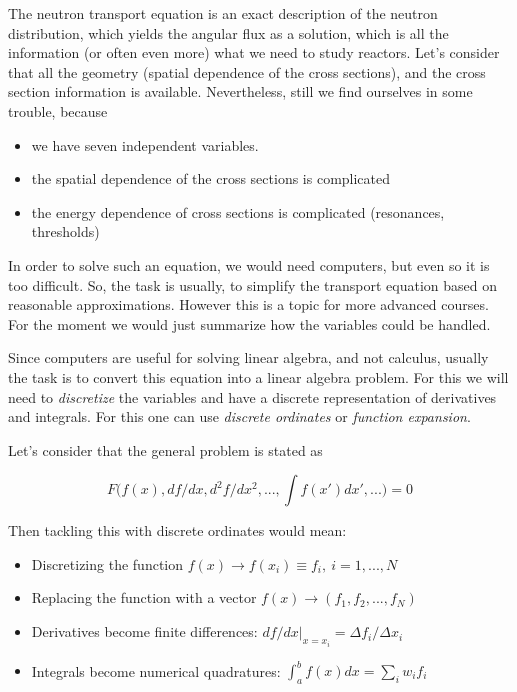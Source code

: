 The neutron transport equation is an exact description of the neutron distribution, which yields the angular flux as a solution, which is all the information (or often even more) what we need to study reactors. Let's consider that all the geometry (spatial dependence of the cross sections), and the cross section information is available. Nevertheless, still we find ourselves in some trouble, because

\begin{itemize}
\item we have seven independent variables.
\item the spatial dependence of the cross sections is complicated
\item the energy dependence of cross sections is complicated (resonances, thresholds)
\end{itemize}

In order to solve such an equation, we would need computers, but even so it is too difficult. So, the task is usually, to simplify the transport equation based on reasonable approximations. However this is a topic for more advanced courses. For the moment we would just summarize how the variables could be handled.

Since computers are useful for solving linear algebra, and not calculus, usually the task is to convert this equation into a linear algebra problem. For this we will need to \textit{discretize} the variables and have a discrete representation of derivatives and integrals. For this one can use \textit{discrete ordinates} or \textit{function expansion}.

Let's consider that the general problem is stated as

\begin{equation}
F\Big(f(x),df/dx,d^2f/dx^2,...,\int f(x')dx',...\Big)=0
\end{equation}

\noindent Then tackling this with discrete ordinates would mean:

\begin{itemize}
\item Discretizing the function  $f(x)\rightarrow f(x_i)\equiv f_i, \: i=1,...,N$
\item Replacing the function with a vector $f(x)\rightarrow (f_1,f_2,...,f_N)$
\item Derivatives become finite differences: $df/dx|_{x=x_i}=\Delta f_i/\Delta x_i$
\item Integrals become numerical quadratures: $\int_a^bf(x)dx=\sum_iw_if_i$
\end{itemize} 

